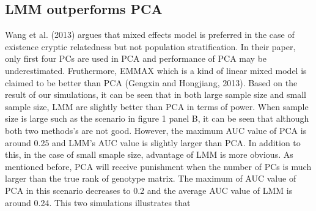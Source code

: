 \documentclass[12pt]{article}
\begin{document}
\subsection{LMM outperforms PCA }
Wang et al. (2013) argues that mixed effects model is preferred in the case of existence cryptic relatedness but not population stratification. In their paper, only first four PCs are used in PCA and performance of PCA may be underestimated. Fruthermore, EMMAX which is a kind of linear mixed model is claimed to be better than PCA (Gengxin and Hongjiang, 2013). Based on the result of our simulations, it can be seen that in both large sample size and small sample size, LMM are slightly better than PCA in terms of power. When sample size is large such as the scenario in figure 1 panel B, it can be seen that although both two methods's are not good. However, the maximum AUC value of PCA is around 0.25 and LMM's AUC value is slightly larger than PCA. In addition to this, in the case of small smaple size, advantage of LMM is more obvious. As mentioned before, PCA will receive punishment when the number of PCs is much larger than the true rank of genotype matrix. The maximum of AUC value of PCA in this scenario decreases to 0.2 and the average AUC value of LMM is around 0.24. This two simulations illustrates that 
\end{document}
